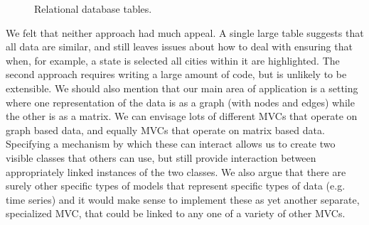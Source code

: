 \documentclass[11pt]{article}
\begin{document}
\begin{figure}[ht]
  \begin{center}
    \hspace{.3in}
    \caption{Relational database tables.}
  \end{center}
\end{figure}

We felt that neither approach had much appeal.  A single large table
suggests that all data are similar, and still leaves issues about how
to deal with ensuring that when, for example, a state is selected all
cities within it are highlighted.  The second approach requires writing a
large amount of code, but is unlikely to be extensible.
We should also mention that our main area of
application is a setting where one representation of the data is as a
graph (with nodes and edges) while the other is as a matrix. We can
envisage lots of different MVCs that operate on graph based data, and
equally MVCs that operate on matrix based data. Specifying a mechanism
by which these can interact allows us to create two visible classes
that others can use, but still provide interaction between
appropriately linked instances of the two classes. We also argue that
there are surely other specific types of models that represent
specific types of data (e.g. time series) and it would make sense to
implement these as yet another separate, specialized MVC, that could
be linked to any one of a variety of other MVCs.
\end{document}
